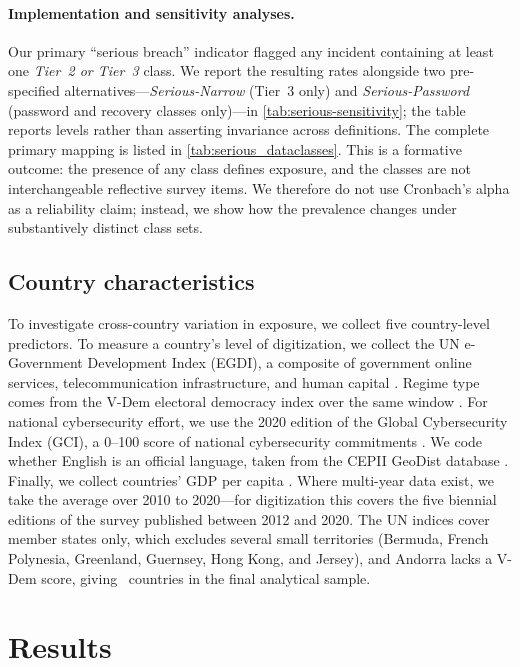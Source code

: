 \documentclass[12pt, letterpaper]{article}
\begin{document}
\paragraph{Implementation and sensitivity analyses.}
Our primary ``serious breach'' indicator flagged any incident containing at least one \emph{Tier~2 or Tier~3} class. We report the resulting rates alongside two pre-specified alternatives—\emph{Serious-Narrow} (Tier~3 only) and \emph{Serious-Password} (password and recovery classes only)—in \cref{tab:serious-sensitivity}; the table reports levels rather than asserting invariance across definitions. The complete primary mapping is listed in \cref{tab:serious_dataclasses}.
This is a formative outcome: the presence of any class defines exposure, and the classes are not interchangeable reflective survey items. We therefore do not use Cronbach's alpha as a reliability claim; instead, we show how the prevalence changes under substantively distinct class sets.



\subsection{Country characteristics}
\label{sec:country-level-data}
To investigate cross-country variation in exposure, we collect five country-level predictors.
To measure a country's level of digitization, we collect the UN e-Government Development Index (EGDI), a composite of government online services, telecommunication infrastructure, and human capital \citep{undesa2020, qog2026}.
Regime type comes from the V-Dem electoral democracy index over the same window \citep{vdem2026}. For national cybersecurity effort, we use the 2020 edition of the Global Cybersecurity Index (GCI), a 0--100 score of national cybersecurity commitments \citep{itu2021gci}.
We code whether English is an official language, taken from the CEPII GeoDist database \citep{mayer2011geodist}.
Finally, we collect countries' GDP per capita \citep{wb}.
Where multi-year data exist, we take the average over 2010 to 2020---for digitization this covers the five biennial editions of the survey published between 2012 and 2020.
The UN indices cover member states only, which excludes several small territories (Bermuda, French Polynesia, Greenland, Guernsey, Hong Kong, and Jersey), and Andorra lacks a V-Dem score, giving \CrossCountryN\ countries in the final analytical sample.


\section{Results}
\end{document}
